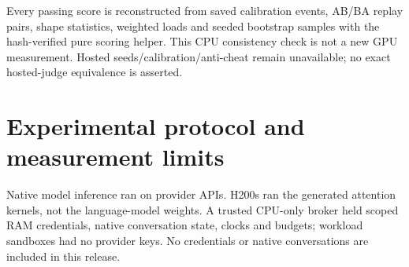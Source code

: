 \documentclass[11pt,letterpaper]{article}
\begin{document}
Every passing score is reconstructed from saved calibration events, AB/BA replay pairs, shape statistics, weighted loads and seeded bootstrap samples with the hash-verified pure scoring helper. This CPU consistency check is not a new GPU measurement. Hosted seeds/calibration/anti-cheat remain unavailable; no exact hosted-judge equivalence is asserted.

\section{Experimental protocol and measurement limits}

Native model inference ran on provider APIs. H200s ran the generated attention kernels, not the language-model weights. A trusted CPU-only broker held scoped RAM credentials, native conversation state, clocks and budgets; workload sandboxes had no provider keys. No credentials or native conversations are included in this release.
\end{document}
